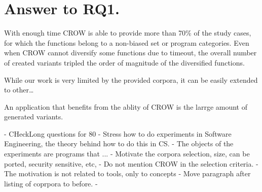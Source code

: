 \section{Answer to RQ1.}

With enough time CROW is able to provide more than 70\% of the study cases, for which the functions belong to a non-biased set or program categories. Even when CROW cannot diversify some functions due to timeout, the overall  number of created variants tripled the order of magnitude of the diversified functions. 

While our work is very limited by the provided corpora, it can be easily extended to other\dots

An application that benefits from the ablity of CROW is the larrge amount of generated variants. 


- CHeckLong questions for 80%
- Stress how to do experiments in Software Engineering, the theory behind how to do this in CS.
- The objects of the experiments are programs that ... 
- Motivate the corpora selection, size, can be ported, security sensitive, etc,
- Do not mention CROW in the selection criteria.
- The motivation is not related to tools, only to concepts
- Move paragraph after listing of coprpora to before.
- 

